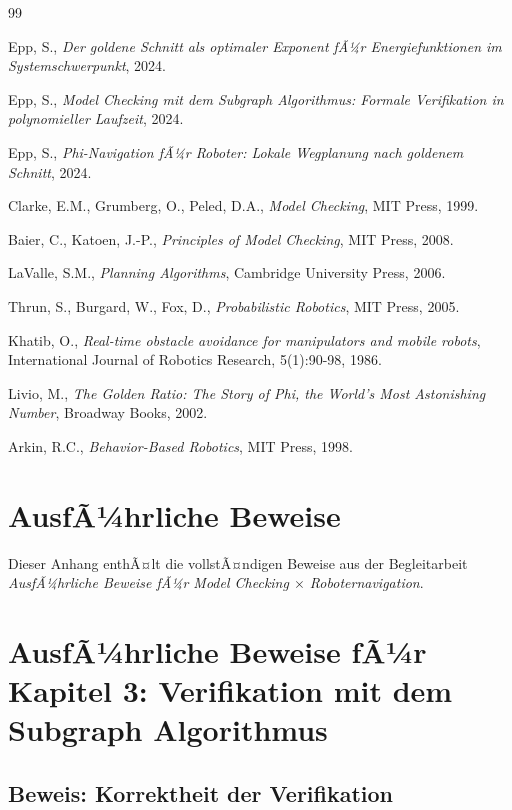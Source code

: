 ﻿\documentclass[a4paper,12pt]{article}
\theoremstyle{definition}
\begin{document}
\begin{thebibliography}{99}
	
	Epp, S.,
	\textit{Der goldene Schnitt als optimaler Exponent fÃ¼r Energiefunktionen im Systemschwerpunkt},
	2024.
	
	Epp, S.,
	\textit{Model Checking mit dem Subgraph Algorithmus: Formale Verifikation in polynomieller Laufzeit},
	2024.
	
	Epp, S.,
	\textit{Phi-Navigation fÃ¼r Roboter: Lokale Wegplanung nach goldenem Schnitt},
	2024.
	
	Clarke, E.M., Grumberg, O., Peled, D.A.,
	\textit{Model Checking},
	MIT Press, 1999.
	
	Baier, C., Katoen, J.-P.,
	\textit{Principles of Model Checking},
	MIT Press, 2008.
	
	LaValle, S.M.,
	\textit{Planning Algorithms},
	Cambridge University Press, 2006.
	
	Thrun, S., Burgard, W., Fox, D.,
	\textit{Probabilistic Robotics},
	MIT Press, 2005.
	
	Khatib, O.,
	\textit{Real-time obstacle avoidance for manipulators and mobile robots},
	International Journal of Robotics Research, 5(1):90-98, 1986.
	
	Livio, M.,
	\textit{The Golden Ratio: The Story of Phi, the World's Most Astonishing Number},
	Broadway Books, 2002.
	
	Arkin, R.C.,
	\textit{Behavior-Based Robotics},
	MIT Press, 1998.
	
\end{thebibliography}

\appendix
\section{AusfÃ¼hrliche Beweise}
\label{app:beweise}

Dieser Anhang enthÃ¤lt die vollstÃ¤ndigen Beweise aus der Begleitarbeit \textit{AusfÃ¼hrliche Beweise fÃ¼r Model Checking $\times$ Roboternavigation}.

\section{AusfÃ¼hrliche Beweise fÃ¼r Kapitel 3: Verifikation mit dem Subgraph Algorithmus}

\subsection{Beweis: Korrektheit der Verifikation}
\end{document}
